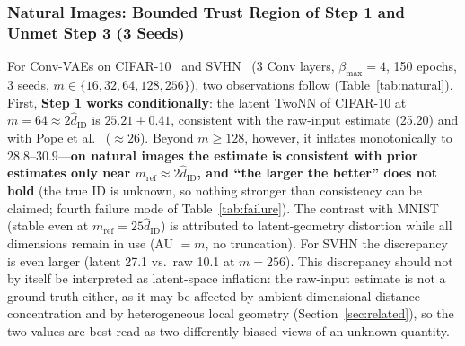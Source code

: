 \documentclass[make,article,submit,pdftex,moreauthors]{Definitions/mdpi}
\newcommand{\hatdID}{\hat{d}_{\mathrm{ID}}}
\begin{document}
\subsubsection{Natural Images: Bounded Trust Region of Step 1 and Unmet Step 3 (3 Seeds)}

For Conv-VAEs on CIFAR-10~\cite{krizhevsky2009learning} and
SVHN~\cite{netzer2011reading} (3 Conv layers, $\beta_{\max} = 4$,
150 epochs, 3 seeds, $m \in \{16, 32, 64, 128, 256\}$), two observations
follow (Table~\ref{tab:natural}).
First, \textbf{Step 1 works conditionally}: the latent TwoNN of CIFAR-10 at
$m = 64 \approx 2\hatdID$ is $25.21 \pm 0.41$, consistent with the raw-input
estimate (25.20) and with Pope et al.~\cite{pope2021intrinsic}
($\approx 26$).
Beyond $m \geq 128$, however, it inflates monotonically to
$28.8$--$30.9$---\textbf{on natural images the estimate is consistent with
prior estimates only near $m_{\mathrm{ref}} \approx 2\hatdID$, and ``the
larger the better'' does not hold} (the true ID is unknown, so nothing
stronger than consistency can be claimed; fourth failure mode of
Table~\ref{tab:failure}).
The contrast with MNIST (stable even at $m_{\mathrm{ref}} = 25\hatdID$) is
attributed to latent-geometry distortion while all dimensions remain in use
(AU $= m$, no truncation).
For SVHN the discrepancy is even larger (latent 27.1 vs.\ raw 10.1 at
$m = 256$).
This discrepancy should not by itself be interpreted as latent-space
inflation: the raw-input estimate is not a ground truth either, as it may
be affected by ambient-dimensional distance concentration and by
heterogeneous local geometry (Section~\ref{sec:related}), so the two
values are best read as two differently biased views of an unknown
quantity.
\end{document}
